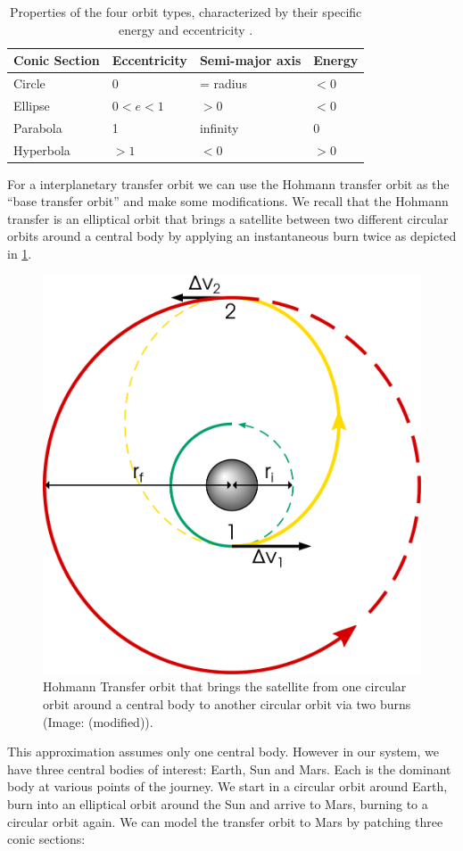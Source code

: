 \begin{table}[tbp]
    \centering
    \begin{tabular}{@{}llll@{}}
    \toprule
    Conic Section & Eccentricity    & Semi-major axis & Energy  \\ \midrule
    Circle        & $0$             & = radius        & $<0$    \\
    Ellipse       & $0 < e < 1$     & $>0$            & $<0$    \\
    Parabola      & 1               & infinity        & $0$     \\
    Hyperbola     & $>1$            & $<0$            & $>0$    \\ \bottomrule
    \end{tabular}
    \caption{Properties of the four orbit types, characterized by their specific energy and eccentricity \cite{Braeunig}.}
    \label{tab:orbit-type-properties}
\end{table}


For a interplanetary transfer orbit we can use the Hohmann transfer orbit as the ``base transfer orbit'' and make some modifications. We recall that the Hohmann transfer is an elliptical orbit that brings a satellite between two different circular orbits around a central body by applying an instantaneous burn twice as depicted in \cref{fig:hohmann}.

\begin{figure}[ht]
    \centering
    \includegraphics[width=0.4\linewidth]{fig/hohmann.pdf}
    \caption{Hohmann Transfer orbit that brings the satellite from one circular orbit around a central body to another circular orbit via two burns (Image: \cite{Leafnode} (modified)).}
    \label{fig:hohmann}
    \end{figure}

This approximation assumes only one central body. However in our system, we have three central bodies of interest: Earth, Sun and Mars. Each is the dominant body at various points of the journey. We start in a circular orbit around Earth, burn into an elliptical orbit around the Sun and arrive to Mars, burning to a circular orbit again. We can model the transfer orbit to Mars by patching three conic sections:

